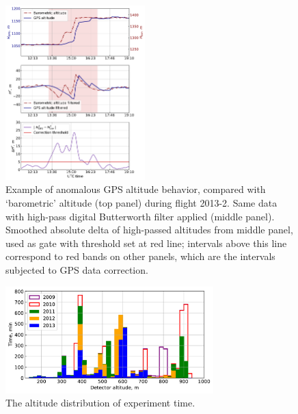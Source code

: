 \documentclass[final,5p,times,twocolumn]{elsarticle}
\begin{document}
\begin{figure}[tb]
    \includegraphics[width=0.48\textwidth]{height_correction.pdf} 
    \caption{Example of anomalous GPS altitude behavior, compared with `barometric' altitude (top panel) during flight 2013-2. Same data with high-pass digital Butterworth filter applied (middle panel). Smoothed absolute delta of high-passed altitudes from middle panel, used as gate with threshold set at red line; intervals above this line correspond to red bands on other panels, which are the intervals subjected to GPS data correction.}

\label{fig:h_corr}
\end{figure}


\begin{figure}[t]
    \includegraphics[width=19pc]{time_on_altitude.pdf}%
    \caption{The altitude distribution of experiment time.}
    \label{fig:time_on_altitude}
\end{figure}
\end{document}
